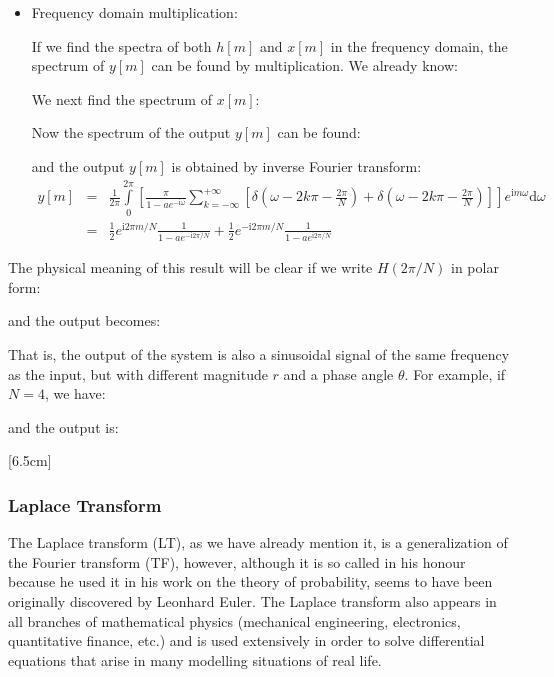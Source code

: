 	\begin{tcolorbox}[colframe=black,colback=white,sharp corners]
	\begin{itemize}
		\item Frequency domain multiplication:
		
		If we find the spectra of both $h[m]$ and $x[m]$ in the frequency domain, the spectrum of $y[m]$ can be found by multiplication. We already know:
		
		We next find the spectrum of $x[m]$:
		
		Now the spectrum of the output $y[m]$ can be found:
		
		and the output $y[m]$ is obtained by inverse Fourier transform:
		\begin{eqnarray}
		y[m] &=& \frac{1}{2\pi} \int\limits_0^{2\pi} \left[\frac{\pi}{1-ae^{-\mathrm{i} \omega}}
		 \sum_{k=-\infty}^{+\infty} \left[\delta(\omega-2k\pi-\frac{2\pi}{N})+\delta(\omega-2k\pi-\frac{2\pi}{N})\right]\right]
			e^{\mathrm{i}m\omega} \mathrm{d}\omega
			\nonumber \\
		 &=& \frac{1}{2}e^{\mathrm{i}2\pi m/N}\frac{1}{1-ae^{-\mathrm{i}2\pi /N}}
			+\frac{1}{2}e^{-\mathrm{i}2\pi m/N}\frac{1}{1-ae^{\mathrm{i}2\pi /N}}	
			\nonumber
		\end{eqnarray}
	\end{itemize}
	
	The physical meaning of this result will be clear if we write $H(2\pi/N)$ in polar form:
	
	and the output becomes:
	
	That is, the output of the system is also a sinusoidal signal of the same 
	frequency as the input, but with different magnitude $r$ and a phase angle
	$\theta$. For example, if $N=4$, we have:
	
	and the output is:
	
	\end{tcolorbox}
	
	
	
	[6.5cm]
	
	\pagebreak
	\subsubsection{Laplace Transform}\label{Laplace transform}
	The Laplace transform (LT), as we have already mention it, is a generalization of the Fourier transform (TF), however, although it is so called in his honour because he used it in his work on the theory of probability, seems to have been originally discovered by Leonhard Euler. The Laplace transform also appears in all branches of mathematical physics (mechanical engineering, electronics, quantitative finance, etc.) and is used extensively in order to solve  differential equations that arise in many modelling situations of real life.
	
